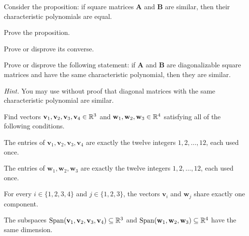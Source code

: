 \begin{problem}
Consider the proposition: if square matrices $\mathbf A$ and $\mathbf B$ are similar, then their characteristic polynomials are equal.
\begin{problemsubparts}
\item Prove the proposition.
\item Prove or disprove its converse.
\item Prove or disprove the following statement: if $\mathbf A$ and $\mathbf B$ are diagonalizable square matrices and have the same characteristic polynomial, then they are similar.
\end{problemsubparts}
\textit{Hint.} You may use without proof that diagonal matrices with the same characteristic polynomial are similar.
\end{problem}

\begin{problem}
Find vectors $\mathbf v_1,\mathbf v_2,\mathbf v_3,\mathbf v_4\in\mathbb{R}^3$ and $\mathbf w_1,\mathbf w_2,\mathbf w_3\in\mathbb{R}^4$ satisfying all of the following conditions.
\begin{problemclauses}
\item The entries of $\mathbf v_1,\mathbf v_2,\mathbf v_3,\mathbf v_4$ are exactly the twelve integers $1,2,\dots,12$, each used once.
\item The entries of $\mathbf w_1,\mathbf w_2,\mathbf w_3$ are exactly the twelve integers $1,2,\dots,12$, each used once.
\item For every $i\in\{1,2,3,4\}$ and $j\in\{1,2,3\}$, the vectors $\mathbf v_i$ and $\mathbf w_j$ share exactly one component.
\item The subspaces $\operatorname{Span}(\mathbf v_1,\mathbf v_2,\mathbf v_3,\mathbf v_4)\subseteq\mathbb{R}^3$ and $\operatorname{Span}(\mathbf w_1,\mathbf w_2,\mathbf w_3)\subseteq\mathbb{R}^4$ have the same dimension.
\end{problemclauses}
\end{problem}

